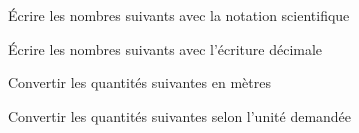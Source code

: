 \documentclass[../Cours.tex]{subfiles}
\begin{document}
\clearpage

\begin{questions}
    \exercice ~~Écrire les nombres suivants avec la notation scientifique\vspace{1ex}
    
    \exercice ~~Écrire les nombres suivants avec l'écriture décimale\vspace{1ex}
    
    \exercice ~~Convertir les quantités suivantes en mètres\vspace{1ex}
    
    \exercice ~~Convertir les quantités suivantes selon l'unité demandée\vspace{1ex}
    

\end{questions}
\end{document}
